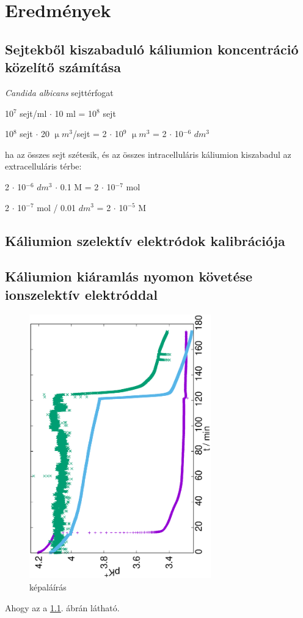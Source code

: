 \chapter{Eredmények}
\pagestyle{headings}


\section{Sejtekből kiszabaduló káliumion koncentráció közelítő számítása}

\emph{Candida albicans} sejttérfogat \cite{chaffin1984relationship}

10$^7$ sejt/ml $\cdot$ 10 ml = 10$^8$ sejt

10$^8$ sejt $\cdot$ 20 $\upmu m^3$/sejt = 2 $\cdot$ 10$^9$ $\upmu m^3$ = 2 $\cdot$ 10$^{-6}$ $dm^3$

ha az összes sejt szétesik, és az összes intracelluláris káliumion kiszabadul az extracelluláris térbe:

2 $\cdot$ 10$^{-6}$ $dm^3$ $\cdot$ 0.1 M = 2 $\cdot$ 10$^{-7}$ mol

2 $\cdot$ 10$^{-7}$ mol / 0.01 $dm^3$ = 2 $\cdot$ 10$^{-5}$ M

\section{Káliumion szelektív elektródok kalibrációja}

\section{Káliumion kiáramlás nyomon követése ionszelektív elektróddal}

\begin{figure}
\centering
\includegraphics[width=0.7\textwidth, angle=-90]{img/mérés.eps}
\caption{képaláírás}
\label{fig:mérések}
\end{figure}

Ahogy az a \ref{fig:mérések}. ábrán látható.


